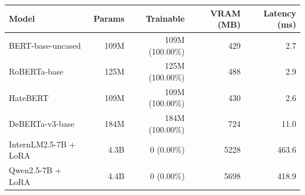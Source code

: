 \begin{tabular}{lrrrr}
\toprule
Model & Params & Trainable & VRAM (MB) & Latency (ms) \\
\midrule
BERT-base-uncased & 109M & 109M (100.00\%) & 429 & 2.7 \\
RoBERTa-base & 125M & 125M (100.00\%) & 488 & 2.9 \\
HateBERT & 109M & 109M (100.00\%) & 430 & 2.6 \\
DeBERTa-v3-base & 184M & 184M (100.00\%) & 724 & 11.0 \\
InternLM2.5-7B + LoRA & 4.3B & 0 (0.00\%) & 5228 & 463.6 \\
Qwen2.5-7B + LoRA & 4.4B & 0 (0.00\%) & 5698 & 418.9 \\
\bottomrule
\end{tabular}
